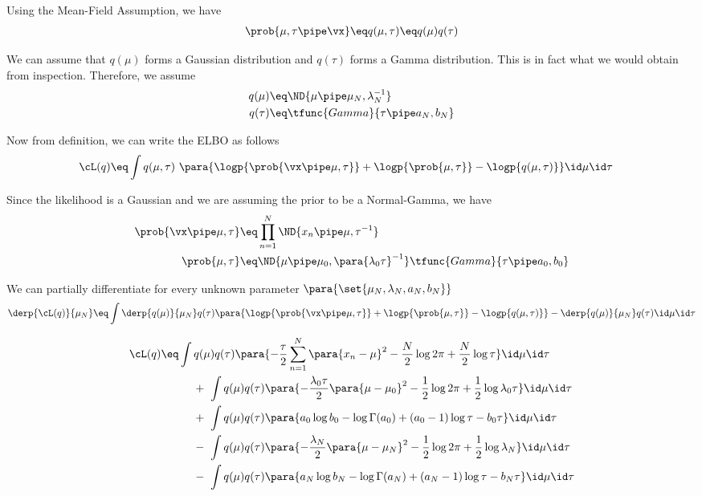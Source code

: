 \documentclass{article}
\begin{document}
\begin{question}

	Using the Mean-Field Assumption, we have
	\begin{align*}
		\prob{\mu, \tau \pipe \vx}	\eq	q(\mu, \tau)	\eq	q(\mu) q(\tau)
	\end{align*}

	We can assume that $q(\mu)$ forms a Gaussian distribution and $q(\tau)$ forms a Gamma distribution. This is in fact what we would obtain from inspection. Therefore, we assume
	\begin{align*}
		q(\mu)	&\eq	\ND{\mu \pipe \mu_N, \lambda_N^{-1}} \\
		q(\tau)	&\eq	\tfunc{Gamma}{\tau \pipe a_N, b_N}
	\end{align*}

	Now from definition, we can write the ELBO as follows
	\begin{align*}
		\cL(q)	&\eq	\int q(\mu, \tau)\ \para{\logp{\prob{\vx \pipe \mu, \tau}} + \logp{\prob{\mu, \tau}} - \logp{q(\mu, \tau)}} \id \mu \id \tau
	\end{align*}

	Since the likelihood is a Gaussian and we are assuming the prior to be a Normal-Gamma, we have
	\begin{align*}
		\prob{\vx \pipe \mu, \tau}	&\eq	\prod_{n = 1}^N \ND{x_n \pipe \mu, \tau^{-1}} \\
		\prob{\mu, \tau}	&\eq	\ND{\mu \pipe \mu_0, \para{\lambda_0 \tau}^{-1}} \tfunc{Gamma}{\tau \pipe a_0, b_0}
	\end{align*}

	We can partially differentiate for every unknown parameter $\para{\set{\mu_N, \lambda_N, a_N, b_N}}$
	\begin{align*}
		\derp{\cL(q)}{\mu_N}	\eq	\int \derp{q(\mu)}{\mu_N} q(\tau) \para{\logp{\prob{\vx \pipe \mu, \tau}} + \logp{\prob{\mu, \tau}} - \logp{q(\mu, \tau)}} - \derp{q(\mu)}{\mu_N} q(\tau) \id \mu \id \tau
	\end{align*}

	\begin{align*}
		\cL(q)	&\eq	\int q(\mu) q(\tau) \para{- \frac{\tau}{2} \sum_{n = 1}^N \para{x_n - \mu}^2 - \frac{N}{2} \log{2 \pi} + \frac{N}{2} \log{\tau}} \id \mu \id \tau \\
		&\hspace{1cm} + \ \int q(\mu) q(\tau) \para{- \frac{\lambda_0 \tau}{2} \para{\mu - \mu_0}^2 - \frac{1}{2} \log{2 \pi} + \frac{1}{2} \log{\lambda_0 \tau}} \id \mu \id \tau \\
		&\hspace{1cm} + \ \int q(\mu) q(\tau) \para{a_0 \log{b_0} - \log{\Gamma(a_0)} + (a_0 - 1) \log{\tau} - b_0 \tau} \id \mu \id \tau \\
		&\hspace{1cm} - \ \int q(\mu) q(\tau) \para{- \frac{\lambda_N}{2} \para{\mu - \mu_N}^2 - \frac{1}{2} \log{2 \pi} + \frac{1}{2} \log{\lambda_N}} \id \mu \id \tau \\
		&\hspace{1cm} - \ \int q(\mu) q(\tau) \para{a_N \log{b_N} - \log{\Gamma(a_N)} + (a_N - 1) \log{\tau} - b_N \tau} \id \mu \id \tau
	\end{align*}


\end{question}
\end{document}
